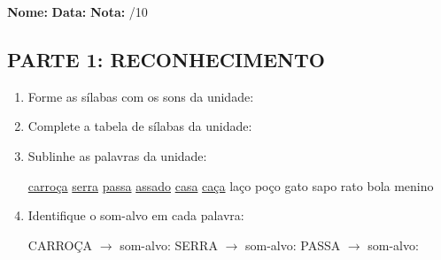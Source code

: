 \begin{exercicio}

\noindent\textbf{Nome:} \underline{\hspace{3.2cm}} \quad \textbf{Data:} \underline{\hspace{1.6cm}} \quad \textbf{Nota:} \underline{\hspace{0.9cm}}/10


\subsection*{PARTE 1: RECONHECIMENTO}

\begin{enumerate}

  \item Forme as sílabas com os sons da unidade:

\begin{center}
\end{center}

  \item Complete a tabela de sílabas da unidade:

\begin{center}
\end{center}

  \item Sublinhe as palavras da unidade:

\begin{center}
  \uline{carroça} \quad \uline{serra} \quad \uline{passa} \quad \uline{assado} \quad \uline{casa} \quad \uline{caça} \quad laço \quad poço \quad gato \quad sapo \quad rato \quad bola \quad menino
\end{center}

  \item Identifique o som-alvo em cada palavra:
  \begin{center}
  CARROÇA $\rightarrow$ som-alvo: \underline{\hspace{1cm}} \quad SERRA $\rightarrow$ som-alvo: \underline{\hspace{1cm}} \quad PASSA $\rightarrow$ som-alvo: \underline{\hspace{1cm}}
  \end{center}


\end{enumerate}
\end{exercicio}
